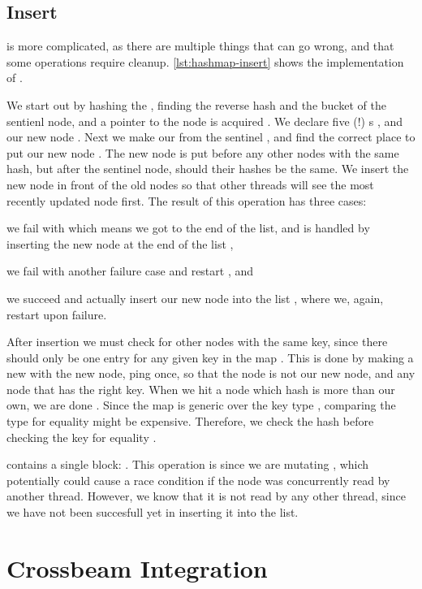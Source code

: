 \subsection{Insert}
 is more complicated, as there are multiple things that can go wrong, and
that some operations require cleanup. \cref{lst:hashmap-insert} shows the implementation of
.



We start out by hashing the , finding the reverse hash  and the bucket of
the sentienl node, and a pointer to the node is acquired . We declare five (!)
s , and  our new node .
Next we make our  from the sentinel , and find the correct place to put
our new node . The new node is put before any other nodes with the same hash, but
after the sentinel node, should their hashes be the same. We insert the new node in front of the
old nodes so that other threads will see the most recently updated node first. The result of this
operation has three cases:
\begin{enumerate*}[1) ]
  \item we fail with  which means we got to the end of the list, and is handled by
    inserting the new node at the end of the list  ,
  \item we fail with another failure case and restart , and
  \item we succeed and actually insert our new node into the list , where we, again,
    restart upon failure.
\end{enumerate*}

After insertion we must check for other nodes with the same key, since there should only be one
entry for any given key in the map . This is done by making a new  with
the new node, ping once, so that the  node is not our new node, and
 any node that has the right key.  When we hit a node which hash is more than our
own, we are done .  Since the map is generic over the key type , comparing
the type for equality might be expensive. Therefore, we check the hash before checking the key for
equality .

 contains a single  block: . This operation is
 since we are mutating , which potentially could cause a race condition
if the node was concurrently read by another thread. However, we know that it is not read by any
other thread, since we have not been succesfull yet in inserting it into the list.




\section{Crossbeam Integration}
\blindtext{}
